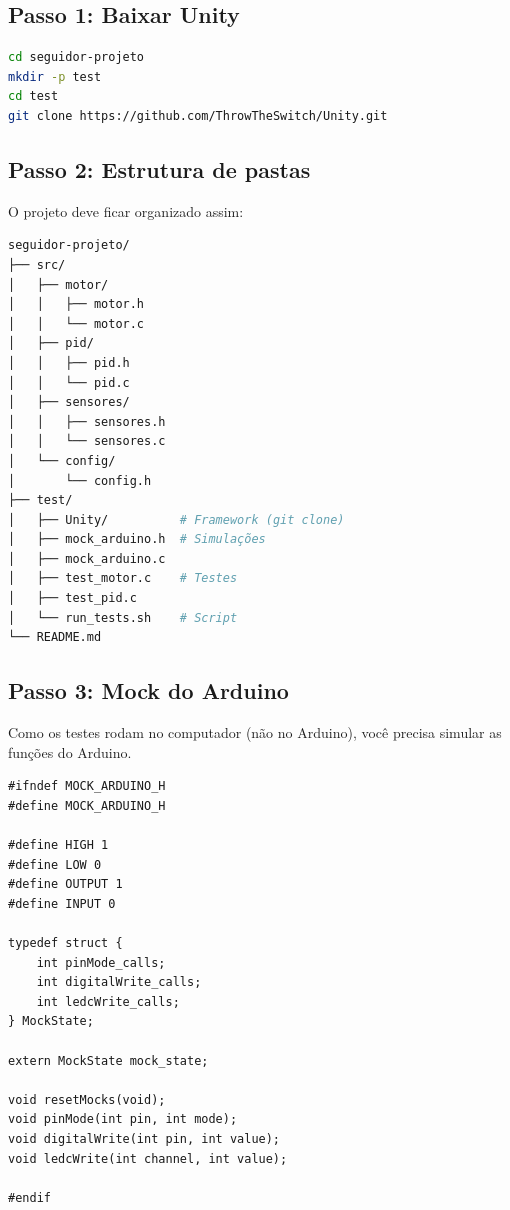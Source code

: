 \documentclass[12pt,a4paper]{article}
\begin{document}
\subsection{Passo 1: Baixar Unity}

\begin{lstlisting}[language=bash, caption=Baixar Unity via Git]
cd seguidor-projeto
mkdir -p test
cd test
git clone https://github.com/ThrowTheSwitch/Unity.git
\end{lstlisting}

\subsection{Passo 2: Estrutura de pastas}

O projeto deve ficar organizado assim:

\begin{lstlisting}[language=bash, caption=Estrutura recomendada]
seguidor-projeto/
├── src/
│   ├── motor/
│   │   ├── motor.h
│   │   └── motor.c
│   ├── pid/
│   │   ├── pid.h
│   │   └── pid.c
│   ├── sensores/
│   │   ├── sensores.h
│   │   └── sensores.c
│   └── config/
│       └── config.h
├── test/
│   ├── Unity/          # Framework (git clone)
│   ├── mock_arduino.h  # Simulações
│   ├── mock_arduino.c
│   ├── test_motor.c    # Testes
│   ├── test_pid.c
│   └── run_tests.sh    # Script
└── README.md
\end{lstlisting}

\subsection{Passo 3: Mock do Arduino}

Como os testes rodam no computador (não no Arduino), você precisa simular as funções do Arduino.

\begin{lstlisting}[caption=mock\_arduino.h - Interface dos mocks]
#ifndef MOCK_ARDUINO_H
#define MOCK_ARDUINO_H

#define HIGH 1
#define LOW 0
#define OUTPUT 1
#define INPUT 0

typedef struct {
    int pinMode_calls;
    int digitalWrite_calls;
    int ledcWrite_calls;
} MockState;

extern MockState mock_state;

void resetMocks(void);
void pinMode(int pin, int mode);
void digitalWrite(int pin, int value);
void ledcWrite(int channel, int value);

#endif
\end{lstlisting}
\end{document}
